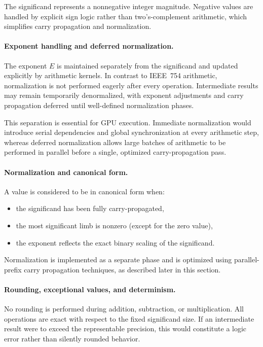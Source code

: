 The significand represents a nonnegative integer magnitude. Negative values are
handled by explicit sign logic rather than two’s-complement arithmetic, which
simplifies carry propagation and normalization.

\paragraph{Exponent handling and deferred normalization.}
The exponent $E$ is maintained separately from the significand and updated
explicitly by arithmetic kernels. In contrast to IEEE~754 arithmetic,
normalization is not performed eagerly after every operation. Intermediate
results may remain temporarily denormalized, with exponent adjustments and
carry propagation deferred until well-defined normalization phases.

This separation is essential for GPU execution. Immediate normalization would
introduce serial dependencies and global synchronization at every arithmetic
step, whereas deferred normalization allows large batches of arithmetic to be
performed in parallel before a single, optimized carry-propagation pass.

\paragraph{Normalization and canonical form.}
A value is considered to be in canonical form when:
\begin{itemize}
  \item the significand has been fully carry-propagated,
  \item the most significant limb is nonzero (except for the zero value),
  \item the exponent reflects the exact binary scaling of the significand.
\end{itemize}
Normalization is implemented as a separate phase and is optimized using
parallel-prefix carry propagation techniques, as described later in this
section.

\paragraph{Rounding, exceptional values, and determinism.}
No rounding is performed during addition, subtraction, or multiplication. All
operations are exact with respect to the fixed significand size. If an
intermediate result were to exceed the representable precision, this would
constitute a logic error rather than silently rounded behavior.

